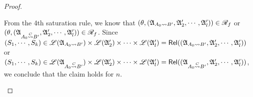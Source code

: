 \begin{proof}
{\begin{itemize}
   From the 4th saturation rule, we know that $(\theta, ({\mathfrak{A} }_{A_0 \rightsquigarrow B'}, {\mathfrak{A} }'_2, \cdots, {\mathfrak{A} }'_l)) \in \mathscr{R}_f$ or $(\theta, ({\mathfrak{A} }_{A_0 \stackrel{C}{\rightsquigarrow} B'}, {\mathfrak{A} }'_2, \cdots, {\mathfrak{A} }'_l)) \in \mathscr{R}_f$. Since $(S_1, \cdots, S_k) \in {\mathscr{L} }({\mathfrak{A} }_{A_0 \rightsquigarrow B'}) \times {\mathscr{L} }({\mathfrak{A} }'_2) \times \cdots \times {\mathscr{L} }({\mathfrak{A} }'_l) = \mathsf{Rel}(({\mathfrak{A} }_{A_0 \rightsquigarrow B'}, {\mathfrak{A} }'_2, \cdots, {\mathfrak{A} }'_l))$ or $(S_1, \cdots, S_k) \in {\mathscr{L} }({\mathfrak{A} }_{A_0 \stackrel{C}{\rightsquigarrow} B'}) \times {\mathscr{L} }({\mathfrak{A} }'_2) \times \cdots \times {\mathscr{L} }({\mathfrak{A} }'_l) = \mathsf{Rel}(({\mathfrak{A} }_{A_0 \stackrel{C}{\rightsquigarrow} B'}, {\mathfrak{A} }'_2, \cdots, {\mathfrak{A} }'_l))$, we conclude that the claim holds for $n$. 
    
%    


\end{itemize}}
\end{proof}
